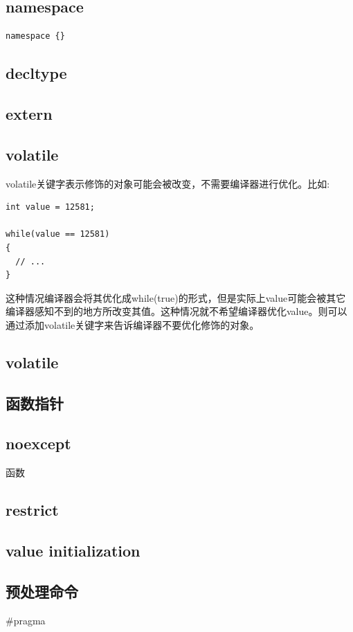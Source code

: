 \documentclass[12pt]{book}
\begin{document}
\subsection{namespace}
\begin{lstlisting}
namespace {}
\end{lstlisting}

\subsection{decltype}
\subsection{extern}
\subsection{volatile}
volatile关键字表示修饰的对象可能会被改变，不需要编译器进行优化。比如:
\begin{lstlisting}
int value = 12581;

while(value == 12581)
{
  // ...
}
\end{lstlisting}
这种情况编译器会将其优化成while(true)的形式，但是实际上value可能会被其它编译器感知不到的地方所改变其值。这种情况就不希望编译器优化value。则可以通过添加volatile关键字来告诉编译器不要优化修饰的对象。

\subsection{volatile}

\subsection{函数指针}
\subsection{noexcept}
函数
\subsection{restrict}
\subsection{value initialization}
\subsection{预处理命令}
\#pragma
\end{document}
